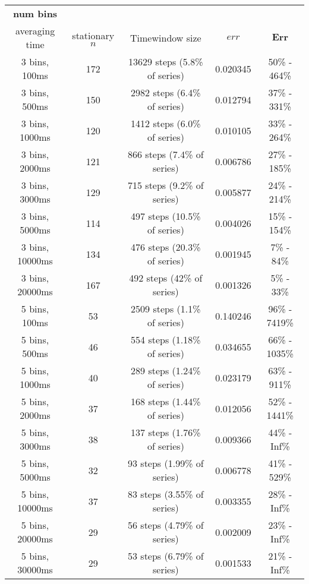 \documentclass[12pt]{article}
\newcommand\mat[1]{\boldsymbol{#1}}
\begin{document}
\begin{table}[H]
\small
\centering
\vspace*{2.5mm}
\begin{tabularx} {\textwidth}{c|c|c|c|c}
\hline
\bf num bins \\ averaging time & stationary $n$ & Timewindow size & $err$ & $\mat{Err}$ \\
\hline\hline
3 bins, 100ms & 172 & 13629 steps (5.8\% of series) & 0.020345 & 50\% - 464\% \\
\hline
3 bins, 500ms & 150 & 2982 steps (6.4\% of series) & 0.012794 & 37\% - 331\% \\
\hline
3 bins, 1000ms & 120 & 1412 steps (6.0\% of series) & 0.010105 & 33\% - 264\% \\
\hline
3 bins, 2000ms & 121 & 866 steps (7.4\% of series) & 0.006786 & 27\% - 185\% \\
\hline
3 bins, 3000ms & 129 & 715 steps (9.2\% of series) & 0.005877 & 24\% - 214\% \\
\hline
3 bins, 5000ms & 114 & 497 steps (10.5\% of series) & 0.004026 & 15\% - 154\% \\
\hline
3 bins, 10000ms & 134 & 476 steps (20.3\% of series) & 0.001945 & 7\% - 84\% \\
\hline
3 bins, 20000ms & 167 & 492 steps (42\% of series) & 0.001326 & 5\% - 33\% \\
\hline
\hline
5 bins, 100ms & 53 & 2509 steps (1.1\% of series) & 0.140246 & 96\% - 7419\% \\
\hline
5 bins, 500ms & 46 & 554 steps (1.18\% of series) & 0.034655 & 66\% - 1035\% \\
\hline
5 bins, 1000ms & 40 & 289 steps (1.24\% of series) & 0.023179 & 63\% - 911\% \\
\hline
5 bins, 2000ms & 37 & 168 steps (1.44\% of series)  & 0.012056 & 52\% - 1441\% \\
\hline
5 bins, 3000ms & 38 & 137 steps (1.76\% of series) &  0.009366 & 44\% - Inf\% \\
\hline
5 bins, 5000ms & 32 & 93 steps (1.99\% of series) & 0.006778 & 41\% - 529\% \\
\hline
5 bins, 10000ms & 37 & 83 steps (3.55\% of series) & 0.003355 & 28\% - Inf\% \\
\hline
5 bins, 20000ms & 29 & 56 steps (4.79\% of series) & 0.002009 & 23\% - Inf\% \\
\hline
5 bins, 30000ms & 29 & 53 steps (6.79\% of series) & 0.001533 & 21\% - Inf\% \\
\hline
\end{tabularx}
\end{table}
\end{document}
